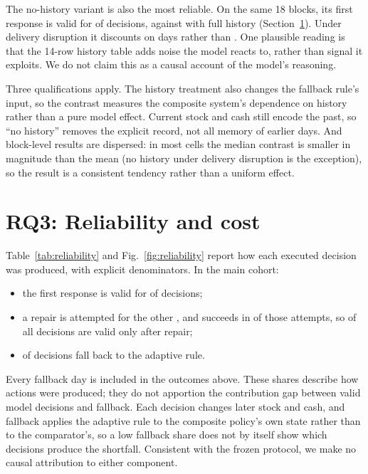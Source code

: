 \documentclass[runningheads]{llncs}
\begin{document}
The no-history variant is also the most reliable. On the same 18 blocks, its first response is valid for  of decisions, against  with full history (Section~\ref{sec:rq3}). Under delivery disruption it discounts on  days rather than . One plausible reading is that the 14-row history table adds noise the model reacts to, rather than signal it exploits. We do not claim this as a causal account of the model's reasoning.

Three qualifications apply. The history treatment also changes the fallback rule's input, so the contrast measures the composite system's dependence on history rather than a pure model effect. Current stock and cash still encode the past, so ``no history'' removes the explicit record, not all memory of earlier days. And block-level results are dispersed: in most cells the median contrast is smaller in magnitude than the mean (no history under delivery disruption is the exception), so the result is a consistent tendency rather than a uniform effect.

\section{RQ3: Reliability and cost}\label{sec:rq3}

\noindent\begin{minipage}{\linewidth}
Table~\ref{tab:reliability} and Fig.~\ref{fig:reliability} report how each executed decision was produced, with explicit denominators. In the main cohort:
\begin{itemize}
\item the first response is valid for  of decisions;
\item a repair is attempted for the other , and succeeds in  of those attempts, so  of all decisions are valid only after repair;
\item {} of decisions fall back to the adaptive rule.
\end{itemize}
\end{minipage}
\smallskip

Every fallback day is included in the outcomes above. These shares describe how actions were produced; they do not apportion the contribution gap between valid model decisions and fallback. Each decision changes later stock and cash, and fallback applies the adaptive rule to the composite policy's own state rather than to the comparator's, so a low fallback share does not by itself show which decisions produce the shortfall. Consistent with the frozen protocol, we make no causal attribution to either component.
\end{document}
